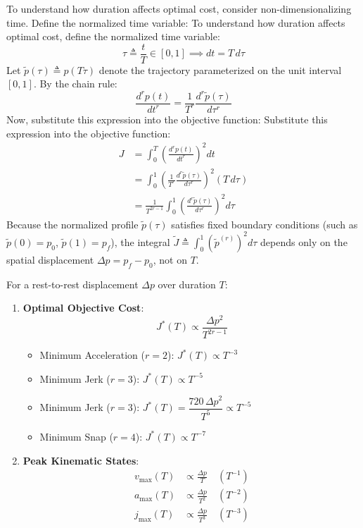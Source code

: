 \documentclass[11pt,a4paper]{article}
\begin{document}
To understand how duration affects optimal cost, consider non-dimensionalizing time. Define the normalized time variable:
To understand how duration affects optimal cost, define the normalized time variable:
\begin{equation}
\tau \triangleq \frac{t}{T} \in [0, 1] \implies dt = T \, d\tau
\end{equation}
Let $\tilde{p}(\tau) \triangleq p(T\tau)$ denote the trajectory parameterized on the unit interval $[0, 1]$. By the chain rule:
\begin{equation}
\frac{d^r p(t)}{dt^r} = \frac{1}{T^r} \frac{d^r \tilde{p}(\tau)}{d\tau^r}
\end{equation}
Now, substitute this expression into the objective function:
Substitute this expression into the objective function:
\begin{align}
J &= \int_0^T \left( \frac{d^r p(t)}{dt^r} \right)^2 dt \\
  &= \int_0^1 \left( \frac{1}{T^r} \frac{d^r \tilde{p}(\tau)}{d\tau^r} \right)^2 (T \, d\tau) \\
  &= \frac{1}{T^{2r - 1}} \int_0^1 \left( \frac{d^r \tilde{p}(\tau)}{d\tau^r} \right)^2 d\tau
\end{align}
Because the normalized profile $\tilde{p}(\tau)$ satisfies fixed boundary conditions (such as $\tilde{p}(0)=p_0$, $\tilde{p}(1)=p_f$), the integral $\tilde{J} \triangleq \int_0^1 (\tilde{p}^{(r)})^2 d\tau$ depends only on the spatial displacement $\Delta p = p_f - p_0$, not on $T$.

\begin{definitionbox}
For a rest-to-rest displacement $\Delta p$ over duration $T$:
\begin{enumerate}
    \item \textbf{Optimal Objective Cost}:
    \begin{equation}
    J^*(T) \propto \frac{\Delta p^2}{T^{2r - 1}}
    \end{equation}
    \begin{itemize}
        \item Minimum Acceleration ($r=2$): $J^*(T) \propto T^{-3}$
        \item Minimum Jerk ($r=3$): $J^*(T) \propto T^{-5}$
        \item Minimum Jerk ($r=3$): $J^*(T) = \dfrac{720 \, \Delta p^2}{T^5} \propto T^{-5}$
        \item Minimum Snap ($r=4$): $J^*(T) \propto T^{-7}$
    \end{itemize}
    \item \textbf{Peak Kinematic States}:
    \begin{align}
    v_{\max}(T) &\propto \frac{\Delta p}{T} \quad (T^{-1}) \\[0.4em]
    a_{\max}(T) &\propto \frac{\Delta p}{T^2} \quad (T^{-2}) \\[0.4em]
    j_{\max}(T) &\propto \frac{\Delta p}{T^3} \quad (T^{-3})
    \end{align}
\end{enumerate}
\end{definitionbox}
\end{document}
